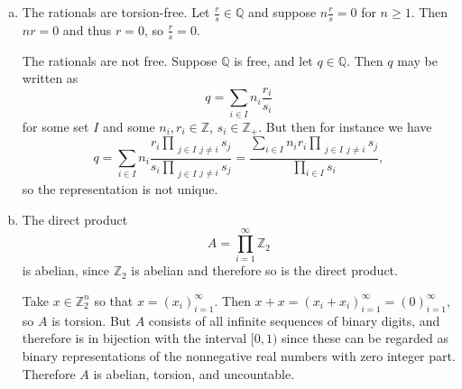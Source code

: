 \documentclass{article}
\begin{document}
\begin{Answer}
\begin{enumerate}[(a)]
{  }
  \item{
    The rationals are torsion-free. Let $\frac{r}{s} \in
    \mathbb{Q}$ and suppose $n \frac{r}{s} = 0$ for $n \geq 1$.
    Then $n r = 0$ and thus $r = 0$, so $\frac{r}{s} = 0$.

    The rationals are not free. Suppose $\mathbb{Q}$ is free, and let
    $q \in \mathbb{Q}$. Then $q$ may be written as
    $$
    q = \sum_{i \in I} n_i \frac{r_i}{s_i}
    $$
    for some set $I$ and some $n_i, r_i \in \mathbb{Z}$, $s_i \in \mathbb{Z}_+$. But then
    for instance we have
    $$
    q
      = \sum_{i \in I} n_i
          \frac{r_i\prod_{\substack{j \in I}{j \neq i}} s_j}
               {s_i \prod_{\substack{j \in I}{j \neq i}} s_j}
      = \frac{\sum_{i \in I} n_i r_i
                \prod_{\substack{j \in I}{j \neq i}} s_j}
             {\prod_{i \in I} s_i},
    $$
    so the representation is not unique.
%
%
  }
  \item{
    The direct product
    $$
    A = \prod_{i=1}^\infty \mathbb{Z}_2
    $$
    is abelian, since $\mathbb{Z}_2$ is abelian and therefore so is
    the direct product.

    Take $x \in \mathbb{Z}_2^n$ so that $x = (x_i)_{i=1}^\infty$. Then
    $x + x = (x_i + x_i)_{i=1}^\infty = (0)_{i=1}^\infty$, so $A$ is torsion.
    But $A$ consists of all infinite sequences of binary digits, and
    therefore is in bijection with the interval $[0, 1)$ since these
    can be regarded as binary representations of the nonnegative real
    numbers with zero integer part.
    Therefore $A$ is abelian, torsion, and uncountable.
  }
\end{enumerate}
\end{Answer}

\pagebreak
\end{document}
